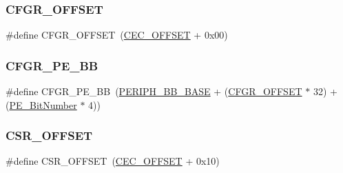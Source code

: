 \mbox{\label{group___c_e_c___private___defines_ga8682298330c3b9bae1992e4f1a0af985}} 
\subsubsection{\texorpdfstring{CFGR\_OFFSET}{CFGR\_OFFSET}}
{\footnotesize\ttfamily \#define C\+F\+G\+R\+\_\+\+O\+F\+F\+S\+ET~(\mbox{\hyperlink{group___c_e_c___private___defines_ga675324bd8967b75f32554f50210821af}{C\+E\+C\+\_\+\+O\+F\+F\+S\+ET}} + 0x00)}

\mbox{\label{group___c_e_c___private___defines_ga9d1f044508cda5ad8213bd7bc5c4363d}} 
\subsubsection{\texorpdfstring{CFGR\_PE\_BB}{CFGR\_PE\_BB}}
{\footnotesize\ttfamily \#define C\+F\+G\+R\+\_\+\+P\+E\+\_\+\+BB~(\mbox{\hyperlink{group___peripheral__memory__map_gaed7efc100877000845c236ccdc9e144a}{P\+E\+R\+I\+P\+H\+\_\+\+B\+B\+\_\+\+B\+A\+SE}} + (\mbox{\hyperlink{group___r_c_c___private___defines_ga8682298330c3b9bae1992e4f1a0af985}{C\+F\+G\+R\+\_\+\+O\+F\+F\+S\+ET}} $\ast$ 32) + (\mbox{\hyperlink{group___c_e_c___private___defines_ga321e547b9574b065127c882e09a4f7e7}{P\+E\+\_\+\+Bit\+Number}} $\ast$ 4))}

\mbox{\label{group___c_e_c___private___defines_ga984cbe73312b6d3d355c5053763d499a}} 
\subsubsection{\texorpdfstring{CSR\_OFFSET}{CSR\_OFFSET}}
{\footnotesize\ttfamily \#define C\+S\+R\+\_\+\+O\+F\+F\+S\+ET~(\mbox{\hyperlink{group___c_e_c___private___defines_ga675324bd8967b75f32554f50210821af}{C\+E\+C\+\_\+\+O\+F\+F\+S\+ET}} + 0x10)}

